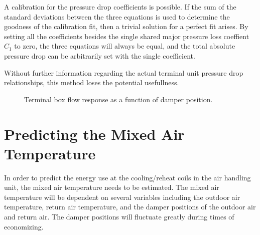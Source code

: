 A calibration for the pressure drop coefficients is possible. If the sum of the standard deviations between the three equations is used to determine the goodness of the calibration fit, then a trivial solution for a perfect fit arises. By setting all the coefficients besides the single shared major pressure loss coeffient \(C_1\) to zero, the three equations will always be equal, and the total absolute pressure drop can be arbitrarily set with the single coefficient. 

Without further information regarding the actual terminal unit pressure drop relationships, this method loses the potential usefullness.  


\begin{figure}
\centering
{}
\caption{Terminal box flow response as a function of damper position.}
\label{fig:flowVersusDamperPos}
\end{figure}


\section{Predicting the Mixed Air Temperature}

In order to predict the energy use at the cooling/reheat coils in the air handling unit, the mixed air temperature needs to be estimated. The mixed air temperature will be dependent on several variables including the outdoor air temperature, return air temperature, and the damper positions of the outdoor air and return air. The damper positions will fluctuate greatly during times of economizing.  

